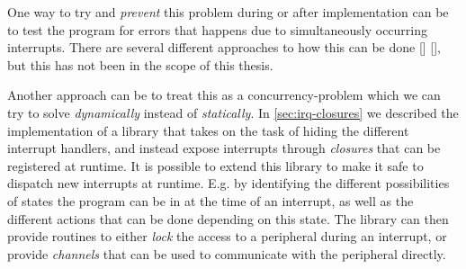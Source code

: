 One way to try and \emph{prevent} this problem during or after implementation can be to test the program for errors that happens due to simultaneously occurring interrupts.
There are several different approaches to how this can be done [] [], but this has not been in the scope of this thesis.

Another approach can be to treat this as a concurrency-problem which we can try to solve \emph{dynamically} instead of \emph{statically}.
In \autoref{sec:irq-closures} we described the implementation of a library that takes on the task of hiding the different interrupt handlers, and instead expose interrupts through \emph{closures} that can be registered at runtime.
It is possible to extend this library to make it safe to dispatch new interrupts at runtime.
E.g. by identifying the different possibilities of states the program can be in at the time of an interrupt, as well as the different actions that can be done depending on this state.
The library can then provide routines to either \emph{lock} the access to a peripheral during an interrupt, or provide \emph{channels} that can be used to communicate with the peripheral directly.